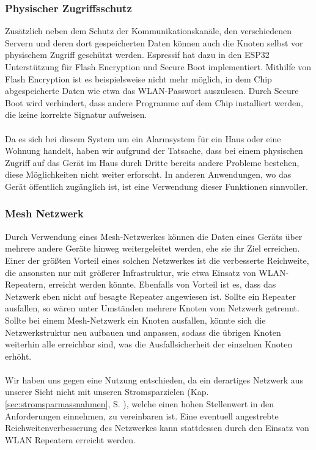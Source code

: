 \documentclass[a4paper,10pt,twocolumn]{article}
\begin{document}
\subsubsection{Physischer Zugriffsschutz}
Zusätzlich neben dem Schutz der Kommunikationskanäle, den verschiedenen Servern und deren dort gespeicherten Daten können auch die Knoten selbst vor physischem Zugriff geschützt werden. Espressif hat dazu in den ESP32 Unterstützung für Flash Encryption\cite{ESPFlashEncryption} und Secure Boot\cite{ESPSecureBoot} implementiert. Mithilfe von Flash Encryption ist es beispielsweise nicht mehr möglich, in dem Chip abgespeicherte Daten wie etwa das WLAN-Passwort auszulesen. Durch Secure Boot wird verhindert, dass andere Programme auf dem Chip installiert werden, die keine korrekte Signatur aufweisen.\\\\
Da es sich bei diesem System um ein Alarmsystem für ein Haus oder eine Wohnung handelt, haben wir aufgrund der Tatsache, dass bei einem physischen Zugriff auf das Gerät im Haus durch Dritte bereits andere Probleme bestehen, diese Möglichkeiten nicht weiter erforscht. In anderen Anwendungen, wo das Gerät öffentlich zugänglich ist, ist eine Verwendung dieser Funktionen sinnvoller.

\subsubsection{Mesh Netzwerk}
Durch Verwendung eines Mesh-Netzwerkes können die Daten eines Geräts über mehrere andere Geräte hinweg weitergeleitet werden, ehe sie ihr Ziel erreichen. Einer der größten Vorteil eines solchen Netzwerkes ist die verbesserte Reichweite, die ansonsten nur mit größerer Infrastruktur, wie etwa Einsatz von WLAN-Repeatern, erreicht werden könnte. Ebenfalls von Vorteil ist es, dass das Netzwerk eben nicht auf besagte Repeater angewiesen ist. Sollte ein Repeater ausfallen, so wären unter Umständen mehrere Knoten vom Netzwerk getrennt. Sollte bei einem Mesh-Netzwerk ein Knoten ausfallen, könnte sich die Netzwerkstruktur neu aufbauen und anpassen, sodass die übrigen Knoten weiterhin alle erreichbar sind, was die Ausfallsicherheit der einzelnen Knoten erhöht.\\\\
Wir haben uns gegen eine Nutzung entschieden, da ein derartiges Netzwerk aus unserer Sicht nicht mit unseren Stromsparzielen (Kap. \ref{sec:stromsparmassnahmen}, S. \pageref{sec:stromsparmassnahmen}), welche einen hohen Stellenwert in den Anforderungen einnehmen, zu vereinbaren ist. Eine eventuell angestrebte Reichweitenverbesserung des Netzwerkes kann stattdessen durch den Einsatz von WLAN Repeatern erreicht werden.
\end{document}
